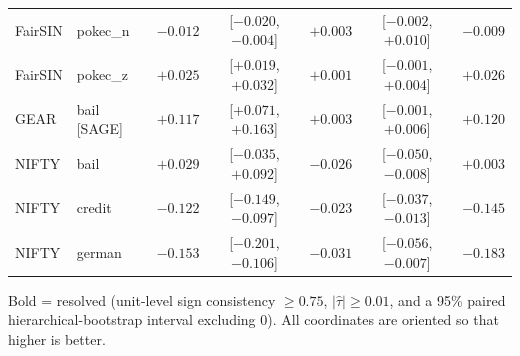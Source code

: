 \begin{table}[t]
\begin{tabular}{llrcrcr}
FairSIN & pokec\_n & $-0.012$ & [$-0.020$, $-0.004$] & $+0.003$ & [$-0.002$, $+0.010$] & $-0.009$ \\
FairSIN & pokec\_z & $+0.025$ & [$+0.019$, $+0.032$] & $+0.001$ & [$-0.001$, $+0.004$] & $+0.026$ \\
\midrule
GEAR & bail [SAGE] & $+0.117$ & [$+0.071$, $+0.163$] & $+0.003$ & [$-0.001$, $+0.006$] & $+0.120$ \\
\midrule
NIFTY & bail & $+0.029$ & [$-0.035$, $+0.092$] & $-0.026$ & [$-0.050$, $-0.008$] & $+0.003$ \\
NIFTY & credit & $-0.122$ & [$-0.149$, $-0.097$] & $\mathbf{-0.023}$ & [$-0.037$, $-0.013$] & $-0.145$ \\
NIFTY & german & $-0.153$ & [$-0.201$, $-0.106$] & $-0.031$ & [$-0.056$, $-0.007$] & $-0.183$ \\
\bottomrule
\end{tabular}
\par\smallskip\footnotesize Bold = resolved (unit-level sign consistency $\geq 0.75$, $|\hat\tau| \geq 0.01$, and a 95\% paired hierarchical-bootstrap interval excluding 0). All coordinates are oriented so that higher is better.
\end{table}

